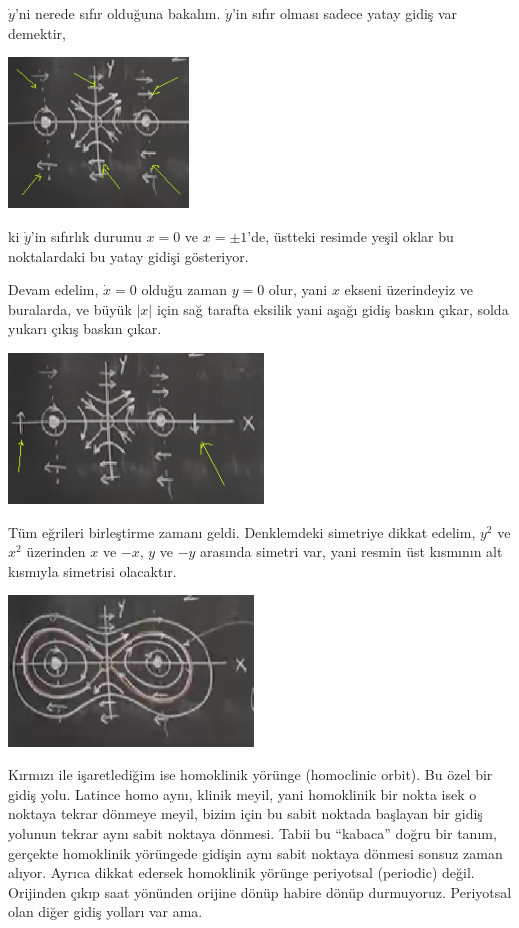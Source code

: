 \documentclass[12pt,fleqn]{article}\usepackage{../../common}
\begin{document}
$\dot{y}$'ni nerede sıfır olduğuna bakalım. $\dot{y}$'in sıfır olması sadece
yatay gidiş var demektir, 

\includegraphics[height=4cm]{07_08.png}

ki $\dot{y}$'in sıfırlık durumu $x=0$ ve $x=\pm 1$'de, üstteki resimde yeşil
oklar bu noktalardaki bu yatay gidişi gösteriyor. 

Devam edelim, $\dot{x}=0$ olduğu zaman $y=0$ olur, yani $x$ ekseni üzerindeyiz
ve buralarda, ve büyük $|x|$ için sağ tarafta eksilik yani aşağı gidiş baskın
çıkar, solda yukarı çıkış baskın çıkar.

\includegraphics[height=4cm]{07_09.png}

Tüm eğrileri birleştirme zamanı geldi. Denklemdeki simetriye dikkat edelim,
$y^2$ ve $x^2$ üzerinden $x$ ve $-x$, $y$ ve $-y$ arasında simetri var, yani
resmin üst kısmının alt kısmıyla simetrisi olacaktır. 

\includegraphics[height=4cm]{07_10.png}

Kırmızı ile işaretlediğim ise homoklinik yörünge (homoclinic orbit). Bu özel bir
gidiş yolu. Latince homo aynı, klinik meyil, yani homoklinik bir nokta isek o
noktaya tekrar dönmeye meyil, bizim için bu sabit noktada başlayan bir gidiş
yolunun tekrar aynı sabit noktaya dönmesi. Tabii bu ``kabaca'' doğru bir tanım,
gerçekte homoklinik yörüngede gidişin aynı sabit noktaya dönmesi sonsuz zaman
alıyor. Ayrıca dikkat edersek homoklinik yörünge periyotsal (periodic)
değil. Orijinden çıkıp saat yönünden orijine dönüp habire dönüp
durmuyoruz. Periyotsal olan diğer gidiş yolları var ama.
\end{document}
